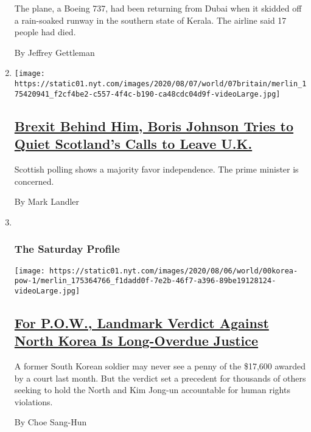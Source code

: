 \begin{enumerate}
  The plane, a Boeing 737, had been returning from Dubai when it skidded
  off a rain-soaked runway in the southern state of Kerala. The airline
  said 17 people had died.

  By Jeffrey Gettleman
\item
  \texttt{[image: https://static01.nyt.com/images/2020/08/07/world/07britain/merlin\_175420941\_f2cf4be2-c557-4f4c-b190-ca48cdc04d9f-videoLarge.jpg]}

  \hypertarget{brexit-behind-him-boris-johnson-tries-to-quiet-scotlands-calls-to-leave-uk}{%
  \subsection{\texorpdfstring{\href{/2020/08/07/world/europe/boris-johnson-scotland-ireland-independence.html}{Brexit
  Behind Him, Boris Johnson Tries to Quiet Scotland's Calls to Leave
  U.K.}}{Brexit Behind Him, Boris Johnson Tries to Quiet Scotland's Calls to Leave U.K.}}\label{brexit-behind-him-boris-johnson-tries-to-quiet-scotlands-calls-to-leave-uk}}

  Scottish polling shows a majority favor independence. The prime
  minister is concerned.

  By Mark Landler
\item ~
  \hypertarget{the-saturday-profile}{%
  \subsubsection{The Saturday Profile}\label{the-saturday-profile}}

  \texttt{[image: https://static01.nyt.com/images/2020/08/06/world/00korea-pow-1/merlin\_175364766\_f1dadd0f-7e2b-46f7-a396-89be19128124-videoLarge.jpg]}

  \hypertarget{for-pow-landmark-verdict-against-north-korea-is-long-overdue-justice}{%
  \subsection{\texorpdfstring{\href{/2020/08/07/world/asia/north-korea-pow-verdict-kim.html}{For
  P.O.W., Landmark Verdict Against North Korea Is Long-Overdue
  Justice}}{For P.O.W., Landmark Verdict Against North Korea Is Long-Overdue Justice}}\label{for-pow-landmark-verdict-against-north-korea-is-long-overdue-justice}}

  A former South Korean soldier may never see a penny of the \$17,600
  awarded by a court last month. But the verdict set a precedent for
  thousands of others seeking to hold the North and Kim Jong-un
  accountable for human rights violations.

  By Choe Sang-Hun
\end{enumerate}

